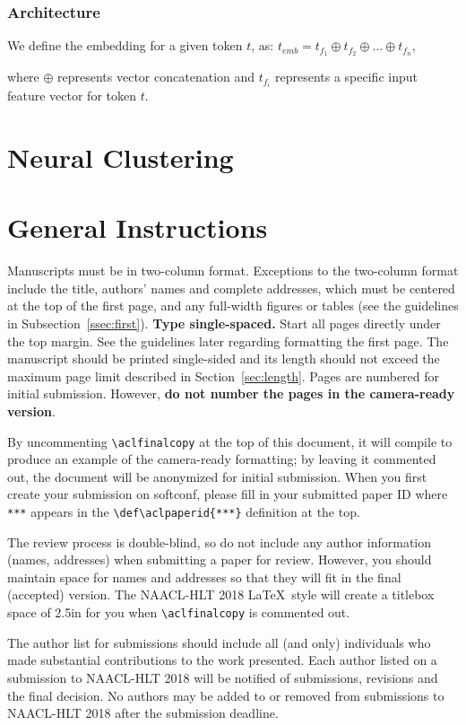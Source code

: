 \documentclass[11pt,a4paper]{article}
\def\aclpaperid{***} %
\begin{document}
\subsubsection{Architecture}
We define the embedding for a given token $t$, as: $t_{emb} = t_{f_{1}} \oplus t_{f_{2}} \oplus \ldots \oplus t_{f_{n}},$

where $\oplus$ represents vector concatenation and $t_{f_{i}}$ represents a specific input feature vector for token $t$.


 

\section{Neural Clustering}
\label{sec:clustering}
\section{General Instructions}

Manuscripts must be in two-column format.  Exceptions to the
two-column format include the title, authors' names and complete
addresses, which must be centered at the top of the first page, and
any full-width figures or tables (see the guidelines in
Subsection~\ref{ssec:first}). {\bf Type single-spaced.}  Start all
pages directly under the top margin. See the guidelines later
regarding formatting the first page.  The manuscript should be
printed single-sided and its length
should not exceed the maximum page limit described in Section~\ref{sec:length}.
Pages are numbered for  initial submission. However, {\bf do not number the pages in the camera-ready version}.

By uncommenting {\small\verb|\aclfinalcopy|} at the top of this 
 document, it will compile to produce an example of the camera-ready formatting; by leaving it commented out, the document will be anonymized for initial submission.  When you first create your submission on softconf, please fill in your submitted paper ID where {\small\verb|***|} appears in the {\small\verb|\def\aclpaperid{***}|} definition at the top.

The review process is double-blind, so do not include any author information (names, addresses) when submitting a paper for review.  
However, you should maintain space for names and addresses so that they will fit in the final (accepted) version.  The NAACL-HLT 2018 \LaTeX\ style will create a titlebox space of 2.5in for you when {\small\verb|\aclfinalcopy|} is commented out.  

The author list for submissions should include all (and only) individuals who made substantial contributions to the work presented. Each author listed on a submission to NAACL-HLT 2018 will be notified of submissions, revisions and the final decision. No authors may be added to or removed from submissions to NAACL-HLT 2018 after the submission deadline.
\end{document}
